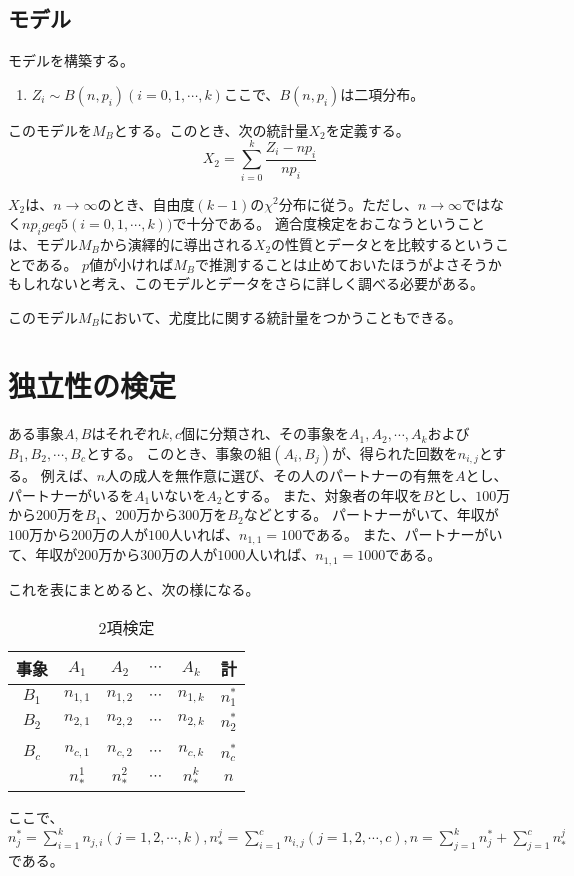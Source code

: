 \subsection{モデル}
モデルを構築する。
\begin{enumerate}
 \item $Z_i \sim B(n,p_i) (i=0,1,\cdots,k) $ここで、$B(n,p_i)$は二項分布。
\end{enumerate}
このモデルを$M_B$とする。このとき、次の統計量$X_2$を定義する。
\begin{equation*}
 X_2 = \sum_{i=0}^{k} \frac{Z_i-n p_i}{n p_i}
\end{equation*}


$X_2$は、$n\rightarrow \infty$のとき、自由度$(k-1)$の$\chi^2$分布に従う。ただし、$n\rightarrow \infty$ではなく$n p_i geq 5 (i=0,1,\cdots,k))$で十分である\cite{1050850569142531968}。
適合度検定をおこなうということは、モデル$M_B$から演繹的に導出される$X_2$の性質とデータとを比較するということである。
$p$値が小ければ$M_B$で推測することは止めておいたほうがよさそうかもしれないと考え、このモデルとデータをさらに詳しく調べる必要がある。

このモデル$M_B$において、尤度比に関する統計量をつかうこともできる。





\section{独立性の検定}
ある事象$A,B$はそれぞれ$k,c$個に分類され、その事象を$A_1,A_2,\cdots,A_k$および$B_1,B_2,\cdots,B_c$とする。
このとき、事象の組$(A_i,B_j)$が、得られた回数を$n_{i,j}$とする。
例えば、$n$人の成人を無作意に選び、その人のパートナーの有無を$A$とし、パートナーがいるを$A_1$いないを$A_2$とする。
また、対象者の年収を$B$とし、$100$万から$200$万を$B_1$、$200$万から$300$万を$B_2$などとする。
パートナーがいて、年収が$100$万から$200$万の人が$100$人いれば、$n_{1,1}=100$である。
また、パートナーがいて、年収が$200$万から$300$万の人が$1000$人いれば、$n_{1,1}=1000$である。

これを表にまとめると、次の様になる。
\begin{table}[hbtp]
 \caption{2項検定}
 \label{table:binomial_test2}
 \centering
\begin{tabular}{c|cccc|c}
 事象& $A_1$ & $A_2$ & $\cdots$ & $A_k$ & 計 \\ \hline
 $B_1$ & $n_{1,1}$ & $n_{1,2}$ & $\cdots$ & $n_{1,k}$ &$n_1^*$ \\ 
 $B_2$ & $n_{2,1}$ & $n_{2,2}$ & $\cdots$ & $n_{2,k}$ &  $n_2^*$ \\
 & & & & & \\
 $B_c$ & $n_{c,1}$ & $n_{c,2}$ & $\cdots$ & $n_{c,k}$ &  $n_c^*$ \\ 
       & $n_*^1$ & $n_*^2$     & $\cdots$ & $n_*^k $  & $n$
\end{tabular}
\end{table}
ここで、$n_j^* = \sum_{i=1}^k n_{j,i} (j=1,2,\cdots,k), n_*^j = \sum_{i=1}^c n_{i,j} (j=1,2,\cdots,c), n = \sum_{j=1}^k n_j^*+ \sum_{j=1}^c n_*^j$である。



